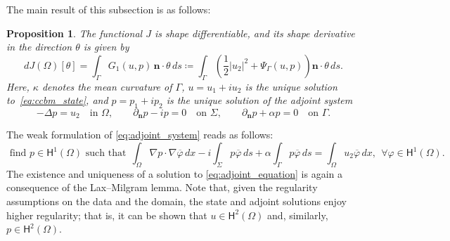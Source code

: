 \documentclass[a4paper,11pt]{article}
\newtheorem{proposition}[theorem]{Proposition}
\newcommand{\vect}[1]{\boldsymbol{\mathbf{#1}}}
\newcommand{\cphi}{\overline{\varphi}}
\newcommand{\ur}{u_{1}}
\newcommand{\ui}{u_{2}}
\newcommand{\vr}{p_{1}}
\newcommand{\vi}{p_{2}}
\newcommand{\GG}{G} %
\newcommand{\HH}{\vect{\mathsf{H}}}
\newcommand{\VV}{\theta}
\newcommand{\nn}{\vect{n}}
\newcommand{\dn}[1]{\partial_{\nn}{#1}}
\newcommand{\intO}[1]{\int_{\varOmega}{#1}{\, {d}{x}}}
\newcommand{\intS}[1]{\int_{\varSigma}{#1}{\, {d}{s}}}
\newcommand{\intG}[1]{\int_{\varGamma}{#1}{\, {d}{s}}}
\begin{document}
The main result of this subsection is as follows:
%
\begin{proposition}
\label{prop:Jmaps}
The functional $J$ is shape differentiable, and its shape derivative in the direction $\VV$ is given by
%
\begin{equation}\label{eq:shape_gradient}
{d}J(\varOmega)[\VV] 
= \intG{ \GG_{1}(u,p) \, \nn \cdot \VV }
\coloneqq \intG{ \left( \frac{1}{2} |\ui|^2 
+
\Psi_{\varGamma}(u, p) \right)\nn \cdot \VV }.
\end{equation}
Here, $\kappa$ denotes the mean curvature of $\varGamma$, $u = \ur + i \ui$ is the unique solution to~\eqref{eq:ccbm_state}, and $p = \vr + i \vi$ is the unique solution of the adjoint system
\begin{equation}\label{eq:adjoint_system}
-\Delta p = \ui \quad \text{in } \varOmega, 
\qquad
\dn{p} - i p = 0 \quad \text{on } \varSigma, 
\qquad
\dn{p} + \alpha p = 0 \quad \text{on } \varGamma.
\end{equation}
\end{proposition}
%
%
% 
The weak formulation of \eqref{eq:adjoint_system} reads as follows:	
\begin{equation}\label{eq:adjoint_equation}
	\text{	find $p \in \HH^{1}(\varOmega)$ such that} \ \ \intO{\nabla p \cdot \nabla \overline{\varphi}} - i \intS{p \overline{\varphi}} + \alpha \intG{p \overline{\varphi}} = \intO{ \ui {\cphi} }, \ \ \forall \varphi \in \HH^{1}(\varOmega).
\end{equation}
The existence and uniqueness of a solution to \eqref{eq:adjoint_equation} is again a consequence of the Lax–Milgram lemma.
Note that, given the regularity assumptions on the data and the domain, the state and adjoint solutions enjoy higher regularity; that is, it can be shown that $u \in \HH^{2}(\varOmega)$ and, similarly, $p \in \HH^{2}(\varOmega)$.
%
%
%
%
%
%
%
%
%
\end{document}
